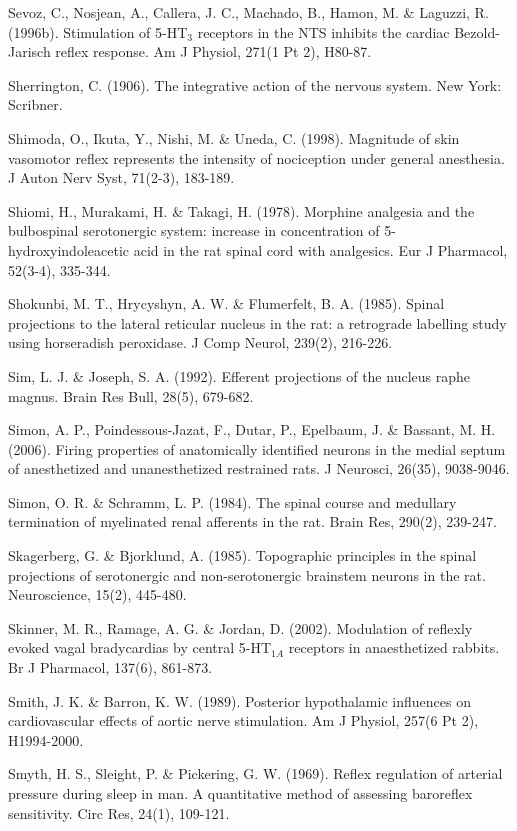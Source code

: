 \documentclass[a4paper,12pt,twoside]{report}
\begin{document}
\begin{singlespacing}
\begin{footnotesize}
Sevoz, C., Nosjean, A., Callera, J. C., Machado, B., Hamon, M. \& Laguzzi, R. (1996b). Stimulation of 5-HT$_{3}$ receptors in the NTS inhibits the cardiac Bezold-Jarisch reflex response. Am J Physiol, 271(1 Pt 2), H80-87.

Sherrington, C. (1906). The integrative action of the nervous system. New York: Scribner.

Shimoda, O., Ikuta, Y., Nishi, M. \& Uneda, C. (1998). Magnitude of skin vasomotor reflex represents the intensity of nociception under general anesthesia. J Auton Nerv Syst, 71(2-3), 183-189.

Shiomi, H., Murakami, H. \& Takagi, H. (1978). Morphine analgesia and the bulbospinal serotonergic system: increase in concentration of 5-hydroxyindoleacetic acid in the rat spinal cord with analgesics. Eur J Pharmacol, 52(3-4), 335-344.

Shokunbi, M. T., Hrycyshyn, A. W. \& Flumerfelt, B. A. (1985). Spinal projections to the lateral reticular nucleus in the rat: a retrograde labelling study using horseradish peroxidase. J Comp Neurol, 239(2), 216-226.

Sim, L. J. \& Joseph, S. A. (1992). Efferent projections of the nucleus raphe magnus. Brain Res Bull, 28(5), 679-682.

Simon, A. P., Poindessous-Jazat, F., Dutar, P., Epelbaum, J. \& Bassant, M. H. (2006). Firing properties of anatomically identified neurons in the medial septum of anesthetized and unanesthetized restrained rats. J Neurosci, 26(35), 9038-9046.

Simon, O. R. \& Schramm, L. P. (1984). The spinal course and medullary termination of myelinated renal afferents in the rat. Brain Res, 290(2), 239-247.

Skagerberg, G. \& Bjorklund, A. (1985). Topographic principles in the spinal projections of serotonergic and non-serotonergic brainstem neurons in the rat. Neuroscience, 15(2), 445-480.

Skinner, M. R., Ramage, A. G. \& Jordan, D. (2002). Modulation of reflexly evoked vagal bradycardias by central 5-HT$_{1A}$ receptors in anaesthetized rabbits. Br J Pharmacol, 137(6), 861-873.

Smith, J. K. \& Barron, K. W. (1989). Posterior hypothalamic influences on cardiovascular effects of aortic nerve stimulation. Am J Physiol, 257(6 Pt 2), H1994-2000.

Smyth, H. S., Sleight, P. \& Pickering, G. W. (1969). Reflex regulation of arterial pressure during sleep in man. A quantitative method of assessing baroreflex sensitivity. Circ Res, 24(1), 109-121.


\end{footnotesize}
\end{singlespacing}
\end{document}
